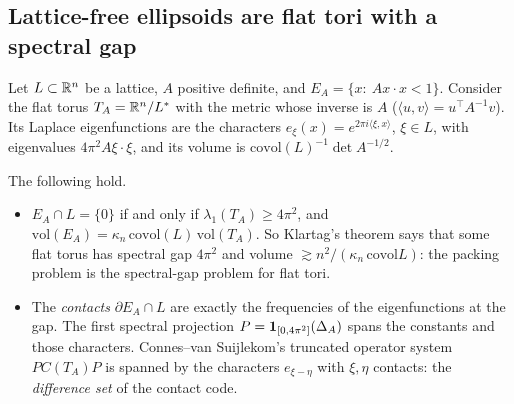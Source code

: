 \label{sec:klartag}
\subsection{Lattice-free ellipsoids are flat tori with a spectral gap}
Let $L\subset\mathbb R^n$ be a lattice, $A$ positive definite, and $E_A=\{x:\ Ax\cdot x<1\}$. Consider the flat torus $T_A=\mathbb R^n/L^*$ with the
metric whose inverse is $A$ ($\langle u,v\rangle=u^\top A^{-1}v$). Its Laplace eigenfunctions are the characters
$e_\xi(x)=e^{2\pi i\langle\xi,x\rangle}$, $\xi\in L$, with eigenvalues $4\pi^2A\xi\cdot\xi$, and its volume is $\mathrm{covol}(L)^{-1}\det A^{-1/2}$.
\begin{proposition}\label{prop:torus}
The following hold.
\begin{itemize}[leftmargin=*]
\item $E_A\cap L=\{0\}$ if and only if $\lambda_1(T_A)\ge4\pi^2$, and $\mathrm{vol}(E_A)=\kappa_n\,\mathrm{covol}(L)\,\mathrm{vol}(T_A)$. So Klartag's theorem
says that some flat torus has spectral gap $4\pi^2$ and volume $\gtrsim n^2/(\kappa_n\,\mathrm{covol}L)$: the packing problem is the
spectral-gap problem for flat tori.
\item The \emph{contacts} $\partial E_A\cap L$ are exactly the frequencies of the eigenfunctions at the gap. The first spectral projection
$P=\mathbf 1_{[0,4\pi^2]}(\Delta_A)$ spans the constants and those characters. Connes--van Suijlekom's truncated operator system
$PC(T_A)P$ is spanned by the characters $e_{\xi-\eta}$ with $\xi,\eta$ contacts: the \emph{difference set} of the contact code.
\end{itemize}
\end{proposition}

